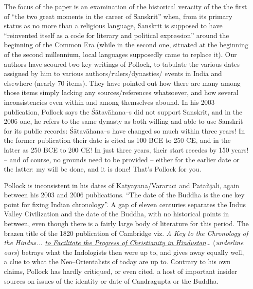 The focus of the paper is an examination of the historical veracity of the the first of “the two great moments in the career of Sanskrit” when, from its primary status as no more than a religious language, Sanskrit is supposed to have “reinvented itself as a code for literary and political expression” around the beginning of the Common Era (while in the second one, situated at the beginning of the second millennium, local languages supposedly came to replace it). Our authors have scoured two key writings of Pollock, to tabulate the various dates assigned by him to various authors/rulers/dynasties/ events in India and elsewhere (nearly 70 items). They have pointed out how there are many among those items simply lacking any sources/references whatsoever, and how several inconsistencies even within and among themselves abound. In his 2003 publication, Pollock says the Śātavāhana–s did not support Sanskrit, and in the 2006 one, he refers to the same dynasty as both willing and able to use Sanskrit for its public records: Śātavāhana–s have changed so much within three years! In the former publication their date is cited as 100 BCE to 250 CE, and in the latter as 250 BCE to 200 CE! In just three years, their start recedes by 150 years! – and of course, no grounds need to be provided – either for the earlier date or the latter: my will be done, and it is done! That’s Pollock for you.

Pollock is inconsistent in his dates of Kātyāyana/Vararuci and Patañjali, again between his 2003 and 2006 publications. “The date of the Buddha is the one key point for fixing Indian chronology”. A gap of eleven centuries separates the Indus Valley Civilization and the date of the Buddha, with no historical points in between, even though there is a fairly large body of literature for this period. The brazen title of the 1820 publication of Cambridge viz. \textit{A Key to the Chronology of the Hindus... \underline{to Facilitate the Progress of Christianity in Hindustan}}… (\textit{underline ours}) betrays what the Indologists then were up to, and gives away equally well, a clue to what the Neo–Orientalists of today are up to. Contrary to his own claims, Pollock has hardly critiqued, or even cited, a host of important insider sources on issues of the identity or date of Candragupta or the Buddha.

